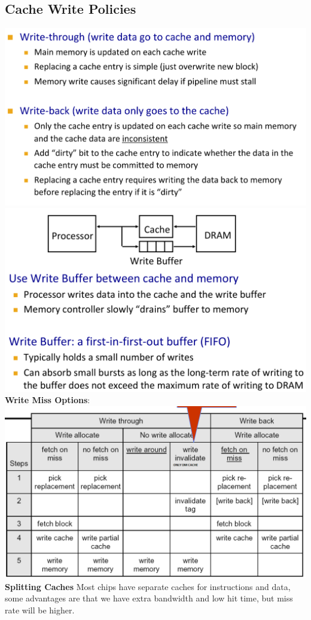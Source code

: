 \subsection*{Cache Write Policies}
\includegraphics[width=\linewidth]{png/write.png}
\includegraphics[width=\linewidth]{png/write(1).png}
\textbf{Write Miss Options}: \\
\includegraphics[width=\linewidth]{png/writemiss.png}
\textbf{Splitting Caches} Most chips have separate caches for instructions and
data, some advantages are that we have extra bandwidth and low hit time, but miss
rate will be higher.

